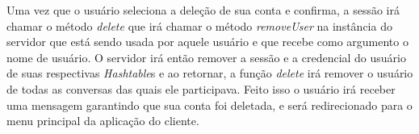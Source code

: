 \documentclass[../main.tex]{subfiles}
\begin{document}
Uma vez que o usuário seleciona a deleção de sua conta e confirma, a sessão irá chamar o método \textit{delete} que irá chamar o método \textit{removeUser} na instância do servidor que está sendo usada por aquele usuário e que recebe como argumento o nome de usuário.
O servidor irá então remover a sessão e a credencial do usuário de suas respectivas \textit{Hashtable}s e ao retornar, a função \textit{delete} irá remover o usuário de todas as conversas das quais ele participava.
Feito isso o usuário irá receber uma mensagem garantindo que sua conta foi deletada, e será redirecionado para o menu principal da aplicação do cliente.
\end{document}
